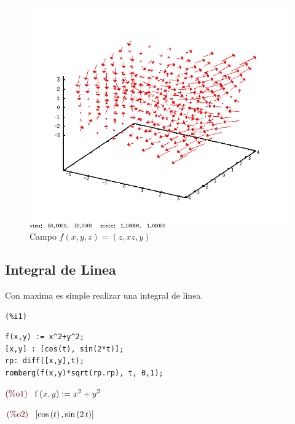 \documentclass[12pt]{article}
\begin{document}
\begin{figure}[H]
\centering
\includegraphics[scale=0.65]{11.png}
\caption{Campo $f(x,y,z)= (z,xz,y)$ }
\end{figure}
 
\subsection{Integral de Linea}
Con maxima es simple realizar una integral de linea.

\noindent
\begin{minipage}[t]{8ex}{\color{red}\bf
\begin{verbatim}
(%i1) 
\end{verbatim}}
\end{minipage}
\begin{minipage}[t]{\textwidth}{\color{blue}
\begin{verbatim}
f(x,y) := x^2+y^2;
[x,y] : [cos(t), sin(2*t)];
rp: diff([x,y],t);
romberg(f(x,y)*sqrt(rp.rp), t, 0,1);
\end{verbatim}}
\end{minipage}
\begin{math}\displaystyle
\parbox{8ex}{\color{labelcolor}(\%o1) }
\mathrm{f}\left( x,y\right) :={x}^{2}+{y}^{2}
\end{math}

\begin{math}\displaystyle
\parbox{8ex}{\color{labelcolor}(\%o2) }
[\mathrm{cos}\left( t\right) ,\mathrm{sin}\left( 2\,t\right) ]
\end{math}
\end{document}
